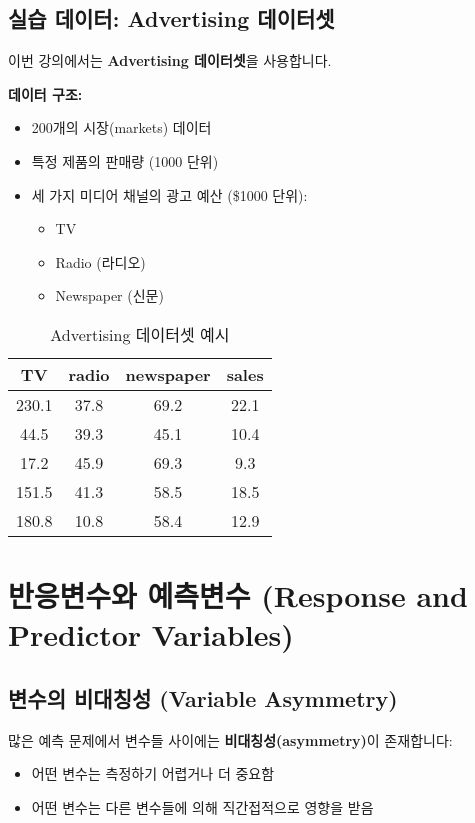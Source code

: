 \documentclass[12pt,a4paper]{article}
\begin{document}
\subsection{실습 데이터: Advertising 데이터셋}

이번 강의에서는 \textbf{Advertising 데이터셋}을 사용합니다.

\textbf{데이터 구조:}
\begin{itemize}
    \item 200개의 시장(markets) 데이터
    \item 특정 제품의 판매량 (1000 단위)
    \item 세 가지 미디어 채널의 광고 예산 (\$1000 단위):
    \begin{itemize}
        \item TV
        \item Radio (라디오)
        \item Newspaper (신문)
    \end{itemize}
\end{itemize}

\begin{table}[h]
\centering
\begin{tabular}{|c|c|c|c|}
\hline
\textbf{TV} & \textbf{radio} & \textbf{newspaper} & \textbf{sales} \\
\hline
230.1 & 37.8 & 69.2 & 22.1 \\
44.5 & 39.3 & 45.1 & 10.4 \\
17.2 & 45.9 & 69.3 & 9.3 \\
151.5 & 41.3 & 58.5 & 18.5 \\
180.8 & 10.8 & 58.4 & 12.9 \\
\hline
\end{tabular}
\caption{Advertising 데이터셋 예시}
\end{table}

\section{반응변수와 예측변수 (Response and Predictor Variables)}

\subsection{변수의 비대칭성 (Variable Asymmetry)}

많은 예측 문제에서 변수들 사이에는 \textbf{비대칭성(asymmetry)}이 존재합니다:

\begin{itemize}
    \item 어떤 변수는 측정하기 어렵거나 더 중요함
    \item 어떤 변수는 다른 변수들에 의해 직간접적으로 영향을 받음
\end{itemize}
\end{document}
